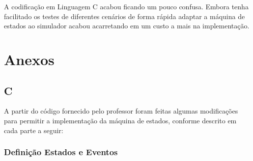 \documentclass[a4paper,11pt]{article}
\begin{document}
A codificação em Linguagem C acabou ficando um pouco confusa. Embora tenha facilitado os testes de diferentes cenários de forma rápida adaptar a máquina de estados ao simulador acabou acarretando em um custo a mais na implementação.

\newpage



\newpage
\section*{Anexos}



\subsection*{C}

A partir do código fornecido pelo professor foram feitas algumas modificações para permitir a implementação da máquina de estados, conforme descrito em cada parte a seguir:

\subsubsection*{Definição Estados e Eventos}
\inputminted[xleftmargin=15pt,linenos,frame=single,framesep=5pt,breaklines=true]{c}{../c/state_machine/inc/state_machine.h}
\end{document}

